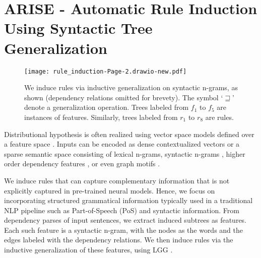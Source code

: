 \section{ARISE - Automatic Rule Induction Using Syntactic Tree Generalization}
\label{sec:genSpace}

\begin{figure*}[h] 
    \centering
   \texttt{[image: rule\_induction-Page-2.drawio-new.pdf]}
   \caption{We induce rules via inductive generalization on syntactic n-grams, as shown (dependency relations omitted for brevety). The symbol `$\sqsupseteq$' denote a generalization operation. Trees labeled from $f_1$ to $f_5$ are instances of features. Similarly, trees labeled from $r_1$ to $r_8$ are rules.}
   \label{genSamples}
   \end{figure*}


Distributional hypothesis \cite{firth1957synopsis} is often realized using vector space models defined over a feature space \cite{turney2010frequency}. Inputs can be encoded as dense contextualized vectors \cite{peters-etal-2018-deep,devlin-etal-2019-bert} or  a sparse semantic space consisting of lexical n-grams, syntactic n-grams \cite{goldberg-orwant-2013-dataset}, higher order dependency features \cite{koo-collins-2010-efficient}, or even graph motifs \cite{biemann2016network}.

We induce rules that can capture complementary information that is not explicitly captured in pre-trained neural models. Hence, we focus on incorporating structured grammatical information typically used in a traditional NLP pipeline \cite{manning-etal-2014-stanford} such as Part-of-Speech (PoS) and syntactic information.  From dependency parses of input sentences, we extract induced subtrees as features. Each such feature is a syntactic n-gram, with the nodes as the words and the edges labeled with the dependency relations. We then induce rules via the inductive generalization of these features, using LGG \cite{Raza_Gulwani_Milic-Frayling_2014, thakoor2018multisynthesis}. %


